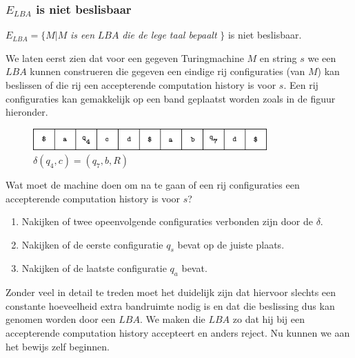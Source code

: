 \subsubsection*{$E_{LBA}$ is niet beslisbaar}

\begin{theorem}
	$E_{LBA} = \{M|M$ \textit{is een} $LBA$ \textit{die de lege taal bepaalt} $\}$ is niet beslisbaar.
\end{theorem}

We laten eerst zien dat voor een gegeven Turingmachine $M$ en string $s$ we een $LBA$ kunnen construeren die gegeven een eindige rij configuraties (van $M$) kan beslissen of die rij een accepterende computation history is voor $s$. Een rij configuraties kan gemakkelijk op een band geplaatst worden zoals in de figuur hieronder.
	\begin{figure}[H]
  	\centering
    	  \includegraphics[width=0.8\textwidth]{./img/lba}
  	\caption{$\delta(q_4,c)=(q_7,b,R)$}
	\end{figure}
Wat moet de machine doen om na te gaan of een rij configuraties een accepterende computation history is voor $s$?
\begin{enumerate}
	\item Nakijken of twee opeenvolgende configuraties verbonden zijn door de $\delta$.
	\item Nakijken of de eerste configuratie $q_s$ bevat op de juiste plaats.
	\item Nakijken of de laatste configuratie $q_a$ bevat.
\end{enumerate}
Zonder veel in detail te treden moet het duidelijk zijn dat hiervoor slechts een constante hoeveelheid extra bandruimte nodig is en dat die beslissing dus kan  genomen worden door een $LBA$. We maken die $LBA$ zo dat hij bij een accepterende computation history accepteert en anders reject. Nu kunnen we aan het bewijs zelf beginnen.

